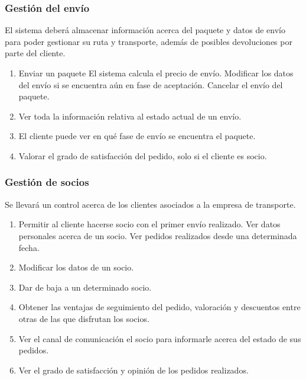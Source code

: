 \subsubsection{Gestión del envío}	
El sistema deberá almacenar información acerca del paquete y datos de envío para poder gestionar su ruta y transporte, además de posibles devoluciones por parte del cliente. 
\begin{enumerate}
	\item Enviar un paquete
	\subitem El sistema calcula el precio de envío.
	\subitem Modificar los datos del envío si se encuentra aún en fase de aceptación.
	\subitem Cancelar el envío del paquete.
	\item Ver toda la información relativa al estado actual de un envío.
	\item El cliente puede ver en qué fase de envío se encuentra el paquete.
	\item Valorar el grado de satisfacción del pedido, solo si el cliente es socio.
\end{enumerate}

\subsubsection{Gestión de socios}
Se llevará un control acerca de los clientes asociados a la empresa de transporte.
\begin{enumerate}
	\item Permitir al cliente hacerse socio con el primer envío realizado.
	\subitem Ver datos personales acerca de un socio.
	\subitem Ver pedidos realizados desde una determinada fecha.
	\item Modificar los datos de un socio.
	\item Dar de baja a un determinado socio.
	\item Obtener las ventajas de seguimiento del pedido, valoración y descuentos entre otras de las que disfrutan los socios.
	\item Ver el canal de comunicación  el socio para informarle acerca del estado de sus pedidos.
	\item Ver el grado de satisfacción y opinión de los pedidos realizados.
\end{enumerate}

